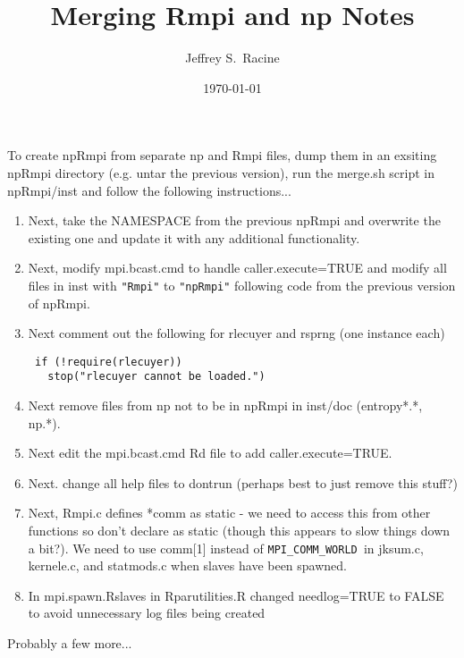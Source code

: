 \documentclass[11pt]{amsart}
\title{Merging Rmpi and np Notes}
\author{Jeffrey S.~Racine}
\date{\today}
\begin{document}
\maketitle

\onehalfspacing

To create npRmpi from separate np and Rmpi files, dump them in an
exsiting npRmpi directory (e.g. untar the previous version), run the
merge.sh script in npRmpi/inst and follow the following
instructions...

\begin{enumerate}

\item Next, take the NAMESPACE from the previous npRmpi and overwrite
  the existing one and update it with any additional functionality.

\item Next, modify mpi.bcast.cmd to handle caller.execute=TRUE and
  modify all files in inst with \verb+"Rmpi"+ to \verb+"npRmpi"+
  following code from the previous version of npRmpi.

\item Next comment out the following for rlecuyer and rsprng (one
  instance each)

\begin{verbatim}
 if (!require(rlecuyer)) 
   stop("rlecuyer cannot be loaded.")
\end{verbatim}

\item Next remove files from np not to be in npRmpi in inst/doc
  (entropy*.*, np.*).

\item Next edit the mpi.bcast.cmd Rd file to add caller.execute=TRUE.

\item Next. change all help files to dontrun (perhaps best to just
  remove this stuff?)

\item Next, Rmpi.c defines *comm as static - we need to access this
  from other functions so don't declare as static (though this appears
  to slow things down a bit?). We need to use comm[1] instead of
  \verb+MPI_COMM_WORLD +in jksum.c, kernele.c, and statmods.c when
  slaves have been spawned.

\item In mpi.spawn.Rslaves in Rparutilities.R changed needlog=TRUE to
  FALSE to avoid unnecessary log files being created

\end{enumerate}

Probably a few more...
\end{document}
